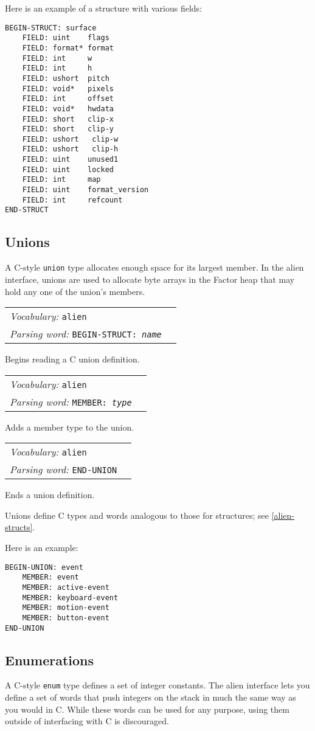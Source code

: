 \documentclass{book}
\newcommand{\vocabulary}[1]{\emph{Vocabulary:} \texttt{#1}&\\}
\newcommand{\parsingword}[2]{\index{\texttt{#1}}\emph{Parsing word:} \texttt{#2}&\\}
\newcommand{\wordtable}[1]{


\begin{tabularx}{12cm}{lX}
\hline
#1
\hline
\end{tabularx}

}
\begin{document}
Here is an example of a structure with various fields:
\begin{verbatim}
BEGIN-STRUCT: surface
    FIELD: uint    flags
    FIELD: format* format
    FIELD: int     w
    FIELD: int     h
    FIELD: ushort  pitch
    FIELD: void*   pixels
    FIELD: int     offset
    FIELD: void*   hwdata
    FIELD: short   clip-x
    FIELD: short   clip-y
    FIELD: ushort   clip-w
    FIELD: ushort   clip-h
    FIELD: uint    unused1
    FIELD: uint    locked
    FIELD: int     map
    FIELD: uint    format_version
    FIELD: int     refcount
END-STRUCT
\end{verbatim}

\subsection{Unions}\label{alien-unions}

A C-style \verb|union| type allocates enough space for its largest member. In the alien interface, unions are used to allocate byte arrays in the Factor heap that may hold any one of the union's members.

\wordtable{
\vocabulary{alien}
\parsingword{BEGIN-STRUCT:}{BEGIN-STRUCT: \emph{name}}
}
Begins reading a C union definition.

\wordtable{
\vocabulary{alien}
\parsingword{MEMBER:}{MEMBER: \emph{type}}
}
Adds a member type to the union.

\wordtable{
\vocabulary{alien}
\parsingword{END-UNION}{END-UNION}
}
Ends a union definition.

Unions define C types and words analogous to those for structures; see \ref{alien-structs}.

Here is an example:
\begin{verbatim}
BEGIN-UNION: event
    MEMBER: event
    MEMBER: active-event
    MEMBER: keyboard-event
    MEMBER: motion-event
    MEMBER: button-event
END-UNION
\end{verbatim}

\subsection{Enumerations}

A C-style \verb|enum| type defines a set of integer constants. The alien interface lets you define a set of words that push integers on the stack in much the same way as you would in C. While these words can be used for any purpose, using them outside of interfacing with C is discouraged.
\end{document}
